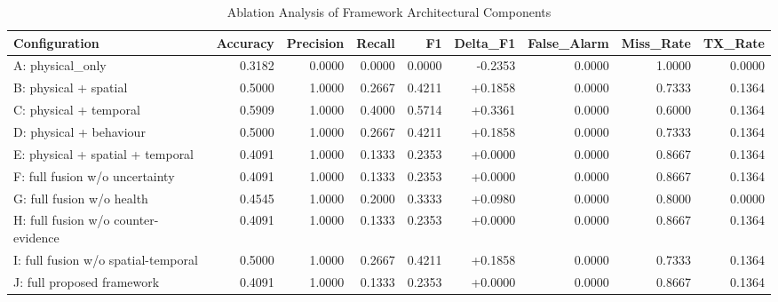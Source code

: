 \begin{table}[htbp]
\centering
\caption{Ablation Analysis of Framework Architectural Components}
\begin{tabular}{lrrrrrrrr}
\toprule
Configuration & Accuracy & Precision & Recall & F1 & Delta\_F1 & False\_Alarm & Miss\_Rate & TX\_Rate \\
\midrule
A: physical\_only & 0.3182 & 0.0000 & 0.0000 & 0.0000 & -0.2353 & 0.0000 & 1.0000 & 0.0000 \\
B: physical + spatial & 0.5000 & 1.0000 & 0.2667 & 0.4211 & +0.1858 & 0.0000 & 0.7333 & 0.1364 \\
C: physical + temporal & 0.5909 & 1.0000 & 0.4000 & 0.5714 & +0.3361 & 0.0000 & 0.6000 & 0.1364 \\
D: physical + behaviour & 0.5000 & 1.0000 & 0.2667 & 0.4211 & +0.1858 & 0.0000 & 0.7333 & 0.1364 \\
E: physical + spatial + temporal & 0.4091 & 1.0000 & 0.1333 & 0.2353 & +0.0000 & 0.0000 & 0.8667 & 0.1364 \\
F: full fusion w/o uncertainty & 0.4091 & 1.0000 & 0.1333 & 0.2353 & +0.0000 & 0.0000 & 0.8667 & 0.1364 \\
G: full fusion w/o health & 0.4545 & 1.0000 & 0.2000 & 0.3333 & +0.0980 & 0.0000 & 0.8000 & 0.0000 \\
H: full fusion w/o counter-evidence & 0.4091 & 1.0000 & 0.1333 & 0.2353 & +0.0000 & 0.0000 & 0.8667 & 0.1364 \\
I: full fusion w/o spatial-temporal & 0.5000 & 1.0000 & 0.2667 & 0.4211 & +0.1858 & 0.0000 & 0.7333 & 0.1364 \\
J: full proposed framework & 0.4091 & 1.0000 & 0.1333 & 0.2353 & +0.0000 & 0.0000 & 0.8667 & 0.1364 \\
\bottomrule
\end{tabular}
\end{table}
